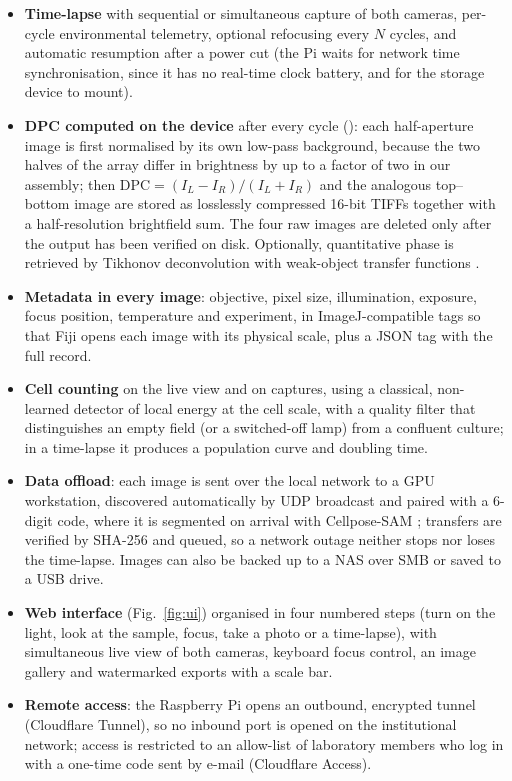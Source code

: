 \documentclass[preprint,12pt]{elsarticle}
\begin{document}
\begin{itemize}
\item \textbf{Time-lapse} with sequential or simultaneous capture of both
  cameras, per-cycle environmental telemetry, optional refocusing every
  $N$ cycles, and automatic resumption after a power cut (the Pi waits for
  network time synchronisation, since it has no real-time clock battery,
  and for the storage device to mount).
\item \textbf{DPC computed on the device} after every cycle
  (): each half-aperture image is first normalised by
  its own low-pass background, because the two halves of the array differ
  in brightness by up to a factor of two in our assembly; then
  $\mathrm{DPC} = (I_L - I_R)/(I_L + I_R)$ and the analogous top--bottom
  image are stored as losslessly compressed 16-bit TIFFs together with a
  half-resolution brightfield sum. The four raw images are deleted only
  after the output has been verified on disk. Optionally, quantitative
  phase is retrieved by Tikhonov deconvolution with weak-object transfer
  functions \cite{Tian2015DPC}.
\item \textbf{Metadata in every image}: objective, pixel size,
  illumination, exposure, focus position, temperature and experiment, in
  ImageJ-compatible tags so that Fiji \cite{Ref079} opens each image with
  its physical scale, plus a JSON tag with the full record.
\item \textbf{Cell counting} on the live view and on captures, using a
  classical, non-learned detector of local energy at the cell scale, with a
  quality filter that distinguishes an empty field (or a switched-off lamp)
  from a confluent culture; in a time-lapse it produces a population curve
  and doubling time.
\item \textbf{Data offload}: each image is sent over the local network to
  a GPU workstation, discovered automatically by UDP broadcast and paired
  with a 6-digit code, where it is segmented on arrival with Cellpose-SAM
  \cite{Ref068,Pachitariu2025CellposeSAM}; transfers are verified by
  SHA-256 and queued, so a network outage neither stops nor loses the
  time-lapse. Images can also be backed up to a NAS over SMB or saved to a
  USB drive.
\item \textbf{Web interface} (Fig.~\ref{fig:ui}) organised in four numbered
  steps (turn on the light, look at the sample, focus, take a photo or a
  time-lapse), with simultaneous live view of both cameras, keyboard focus
  control, an image gallery and watermarked exports with a scale bar.
\item \textbf{Remote access}: the Raspberry Pi opens an outbound,
  encrypted tunnel (Cloudflare Tunnel), so no inbound port is opened on the
  institutional network; access is restricted to an allow-list of
  laboratory members who log in with a one-time code sent by e-mail
  (Cloudflare Access).
\end{itemize}
\end{document}
